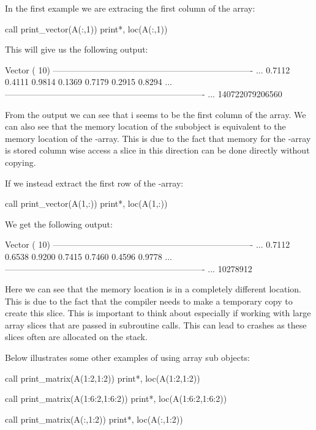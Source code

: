 In the first example we are extracing the first column of the  array:

\begin{fortrancodeenv}
call print_vector(A(:,1))
print*, loc(A(:,1))
\end{fortrancodeenv}

This will give us the following output:

\begin{fortrancodeenv}
Vector ( 10)
---------------------------------------------------------------------- ...
    0.7112    0.4111    0.9814    0.1369    0.7179    0.2915    0.8294 ...
---------------------------------------------------------------------- ...
      140722079206560
\end{fortrancodeenv}

From the output we can see that i seems to be the first column of the  array. We can also see that the memory location of the subobject is equivalent to the memory location of the -array. This is due to the fact that memory for the -array is stored column wise access a slice in this direction can be done directly without copying.

If we instead extract the first row of the -array:

\begin{fortrancodeenv}
call print_vector(A(1,:))
print*, loc(A(1,:))
\end{fortrancodeenv}

We get the following output:

\begin{fortrancodeenv}
Vector ( 10)
---------------------------------------------------------------------- ...
    0.7112    0.6538    0.9200    0.7415    0.7460    0.4596    0.9778 ...
---------------------------------------------------------------------- ...
             10278912
\end{fortrancodeenv}

Here we can see that the memory location is in a completely different location. This is due to the fact that the compiler needs to make a temporary copy to create this slice. This is important to think about especially if working with large array slices that are passed in subroutine calls. This can lead to crashes as these slices often are allocated on the stack.

Below illustrates some other examples of using array sub objects:

\begin{fortrancodeenv}
call print_matrix(A(1:2,1:2))
print*, loc(A(1:2,1:2))

call print_matrix(A(1:6:2,1:6:2))
print*, loc(A(1:6:2,1:6:2))

call print_matrix(A(:,1:2))
print*, loc(A(:,1:2))
\end{fortrancodeenv}

